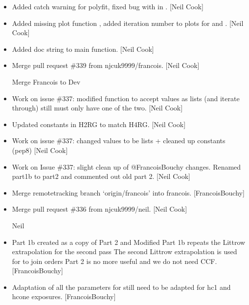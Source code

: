 \documentclass[a4paper,10pt,english]{report}
\begin{document}
\begin{itemize}
\item {} 
Added catch warning for polyfit, fixed bug with  in
. {[}Neil Cook{]}

\item {} 
Added missing plot function , added
iteration number to plots for  and
. {[}Neil Cook{]}

\item {} 
Added doc string to  main function. {[}Neil Cook{]}

\item {} 
Merge pull request \#339 from njcuk9999/francois. {[}Neil Cook{]}

Merge Francois to Dev

\item {} 
Work on issue \#337: modified  function to accept
 values as lists (and iterate through) \sphinxhyphen{} still must only have
one of the two. {[}Neil Cook{]}

\item {} 
Updated constants in H2RG to match H4RG. {[}Neil Cook{]}

\item {} 
Work on issue \#337: changed  values to be lists + cleaned up
constants (pep8) {[}Neil Cook{]}

\item {} 
Work on Issue \#337: slight clean up of @FrancoisBouchy changes.
Renamed part1b to part2 and commented out old part 2. {[}Neil Cook{]}

\item {} 
Merge remote\sphinxhyphen{}tracking branch ‘origin/francois’ into francois.
{[}FrancoisBouchy{]}

\item {} 
Merge pull request \#336 from njcuk9999/neil. {[}Neil Cook{]}

Neil

\item {} 
Part 1b created as a copy of Part 2 and Modified Part 1b repeats the
Littrow extrapolation for the second pass The second Littrow
extrapolation is used for to join orders Part 2 is no more useful and
we do not need CCF. {[}FrancoisBouchy{]}

\item {} 
Adaptation of all the parameters for   still need to be
adapted for hc1 and hcone exposures. {[}FrancoisBouchy{]}


\end{itemize}
\end{document}
